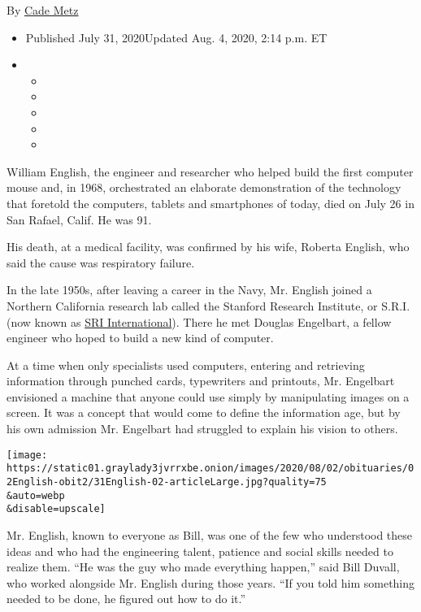 By \href{https://www.nytimes3xbfgragh.onion/by/cade-metz}{Cade Metz}

\begin{itemize}
\item
  Published July 31, 2020Updated Aug. 4, 2020, 2:14 p.m. ET
\item
  \begin{itemize}
  \item
  \item
  \item
  \item
  \item
  \end{itemize}
\end{itemize}

William English, the engineer and researcher who helped build the first
computer mouse and, in 1968, orchestrated an elaborate demonstration of
the technology that foretold the computers, tablets and smartphones of
today, died on July 26 in San Rafael, Calif. He was 91.

His death, at a medical facility, was confirmed by his wife, Roberta
English, who said the cause was respiratory failure.

In the late 1950s, after leaving a career in the Navy, Mr. English
joined a Northern California research lab called the Stanford Research
Institute, or S.R.I. (now known as \href{https://www.sri.com/}{SRI
International}). There he met Douglas Engelbart, a fellow engineer who
hoped to build a new kind of computer.

At a time when only specialists used computers, entering and retrieving
information through punched cards, typewriters and printouts, Mr.
Engelbart envisioned a machine that anyone could use simply by
manipulating images on a screen. It was a concept that would come to
define the information age, but by his own admission Mr. Engelbart had
struggled to explain his vision to others.

\texttt{[image: https://static01.graylady3jvrrxbe.onion/images/2020/08/02/obituaries/02English-obit2/31English-02-articleLarge.jpg?quality=75\\\&auto=webp\\\&disable=upscale]}

Mr. English, known to everyone as Bill, was one of the few who
understood these ideas and who had the engineering talent, patience and
social skills needed to realize them. ``He was the guy who made
everything happen,'' said Bill Duvall, who worked alongside Mr. English
during those years. ``If you told him something needed to be done, he
figured out how to do it.''

